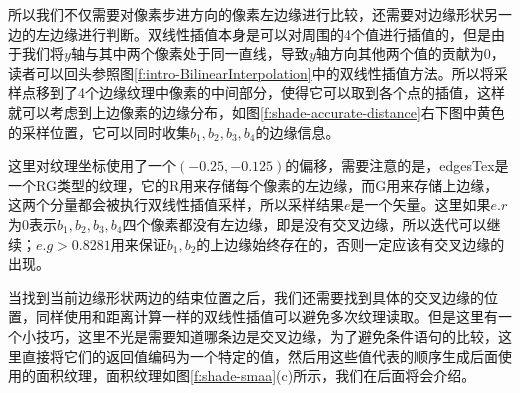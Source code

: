所以我们不仅需要对像素步进方向的像素左边缘进行比较，还需要对边缘形状另一边的左边缘进行判断。双线性插值本身是可以对周围的4个值进行插值的，但是由于我们将$y$轴与其中两个像素处于同一直线，导致$y$轴方向其他两个值的贡献为0，读者可以回头参照图\ref{f:intro-BilinearInterpolation}中的双线性插值方法。所以\cite{a:SMAA:EnhancedSubpixelMorphologicalAntialiasing}将采样点移到了4个边缘纹理中像素的中间部分，使得它可以取到各个点的插值，这样就可以考虑到上边像素的边缘分布，如图\ref{f:shade-accurate-distance}右下图中黄色的采样位置，它可以同时收集$b_1,b_2,b_3,b_4$的边缘信息。        

这里对纹理坐标使用了一个$(-0.25,-0.125)$的偏移，需要注意的是，edgesTex是一个RG类型的纹理，它的R用来存储每个像素的左边缘，而G用来存储上边缘，这两个分量都会被执行双线性插值采样，所以采样结果$e$是一个矢量。这里如果$e.r$为0表示$b_1,b_2,b_3,b_4$四个像素都没有左边缘，即是没有交叉边缘，所以迭代可以继续；$e.g>0.8281$用来保证$b_1,b_2$的上边缘始终存在的，否则一定应该有交叉边缘的出现。

当找到当前边缘形状两边的结束位置之后，我们还需要找到具体的交叉边缘的位置，同样使用和距离计算一样的双线性插值可以避免多次纹理读取。但是这里有一个小技巧，这里不光是需要知道哪条边是交叉边缘，为了避免条件语句的比较，这里直接将它们的返回值编码为一个特定的值，然后用这些值代表的顺序生成后面使用的面积纹理，面积纹理如图\ref{f:shade-smaa}(c)所示，我们在后面将会介绍。


